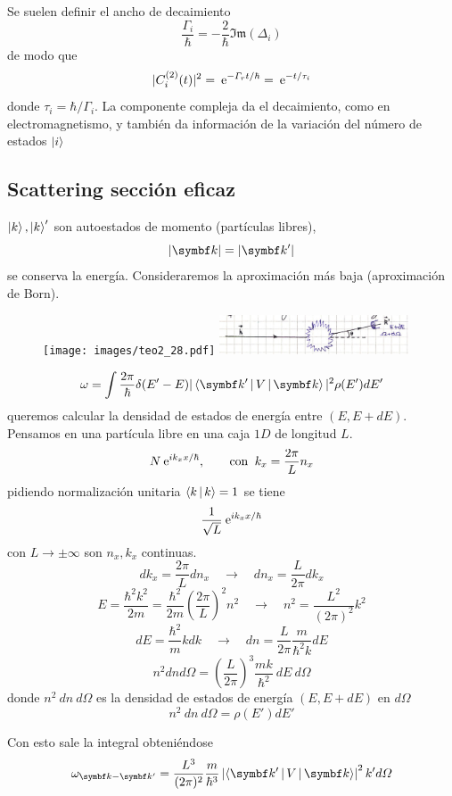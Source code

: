 \documentclass[10pt,oneside]{CBFT_book}
\begin{document}
Se suelen definir el ancho de decaimiento
\[
	\frac{\Gamma_i}{\hbar} = - \frac{2}{\hbar}\mathfrak{Im}(\Delta_i)
\]
de modo que
\[
	|C_i^{(2)}(t)|^2 = \:\mathrm{e}^{ - \Gamma_r t /\hbar} = \:\mathrm{e}^{ - t/\tau_i}
\]
donde $\tau_i = \hbar / \Gamma_i$. La componente compleja da el decaimiento, como en electromagnetismo,
y también da información de la variación del número de estados $\Ket{i}$

\subsection{Scattering sección eficaz}

$\Ket{k},\Ket{k}'$ son autoestados de momento (partículas libres),
\[
	|\vb{k}| = |\vb{k}'| 
\]
se conserva la energía. Consideraremos la aproximación más baja (aproximación de Born).
\begin{figure}[htb]
	\begin{center}
	\texttt{[image: images/teo2\_28.pdf]}
	\includegraphics[width=0.5\textwidth]{images/fig_ft2_scattering_section.jpg}
	\end{center}
	\caption{}
\end{figure} 

\[
	\omega = \int \frac{2\pi}{\hbar}  \delta(E'-E) |\Braket{\vb{k}'|V|\vb{k}}|^2 \rho(E') dE'
\]
queremos calcular la densidad de estados de energía entre $(E,E+dE)$. Pensamos en una partícula libre en una 
caja $1D$ de longitud $L$.
\[
	N \:\mathrm{e}^{i k_x x /\hbar}, \qquad \text{con} \;\; k_x = \frac{2\pi}{L}n_x
\]
pidiendo normalización unitaria $\Braket{k|k}=1$ se tiene 
\[
	\frac{1}{\sqrt{L}} \:\mathrm{e}^{i k_x x /\hbar}
\]
con $L\to\pm\infty$ son $n_x,k_x$ continuas.
\[
	dk_x = \frac{2\pi}{L} dn_x \quad \longrightarrow \quad  dn_x = \frac{L}{2\pi} dk_x 
\]
\[
	E = \frac{\hbar^2k^2}{2m} = \frac{\hbar^2}{2m} \left( \frac{2\pi}{L}\right)^2 n^2 \quad 
	\longrightarrow \quad n^2 = \frac{L^2}{(2\pi)^2}k^2
\]
\[
	dE = \frac{\hbar^2}{m} k dk \quad \longrightarrow \quad dn = \frac{L}{2\pi}\frac{m}{\hbar^2 k} dE
\]
\[
	n^2 dn d\Omega = \left( \frac{L}{2\pi} \right)^3 \frac{mk}{\hbar^2} \:dE \:d\Omega
\]
donde $n^2\:dn\:d\Omega$ es la densidad de estados de energía $(E,E+dE)$ en $d\Omega$
\[
	n^2 \: dn \: d\Omega = \rho(E') dE'
\]

Con esto sale la integral obteniéndose
\[
	\omega_{\vb{k}-\vb{k}'} = 
	\frac{L^3}{(2\pi)^2} \frac{m}{\hbar^3} \left|\Braket{\vb{k}'|V|\vb{k}}\right|^2 k'd\Omega
\]
\end{document}
